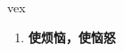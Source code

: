 
\begin{frame}
{\huge vex}
\begin{center}
\begin{enumerate}\Large
  \item \textbf{使烦恼，使恼怒}
\end{enumerate}
\end{center}
\end{frame}

